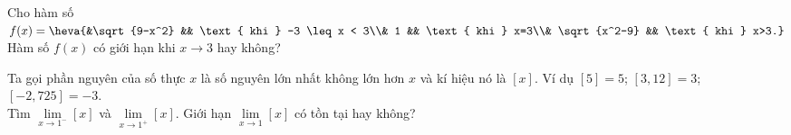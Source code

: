 \begin{vd}%
	Cho hàm số $f(x) = \heva{&\sqrt{9-x^2} && \text{ khi } -3 \leq x < 3\\& 1 && \text{ khi } x=3\\& \sqrt{x^2-9} && \text{ khi } x>3.}$ \\
	Hàm số $f(x)$ có giới hạn khi $x \to 3$ hay không?
\end{vd}

\begin{vd}%
	Ta gọi phần nguyên của số thực $x$ là số nguyên lớn nhất không lớn hơn $x$ và kí hiệu nó là $[x]$. 
	Ví dụ $[5]=5 $; $[3,12]=3 $; $[-2{,}725]=-3$. \\
	Tìm $\lim\limits _{x \rightarrow 1^{-}} [x]$ và  $\lim\limits _{x \rightarrow 1^{+}} [x]$. Giới hạn $\lim\limits _{x \rightarrow 1} [x]$ có tồn tại hay không?
\end{vd}

